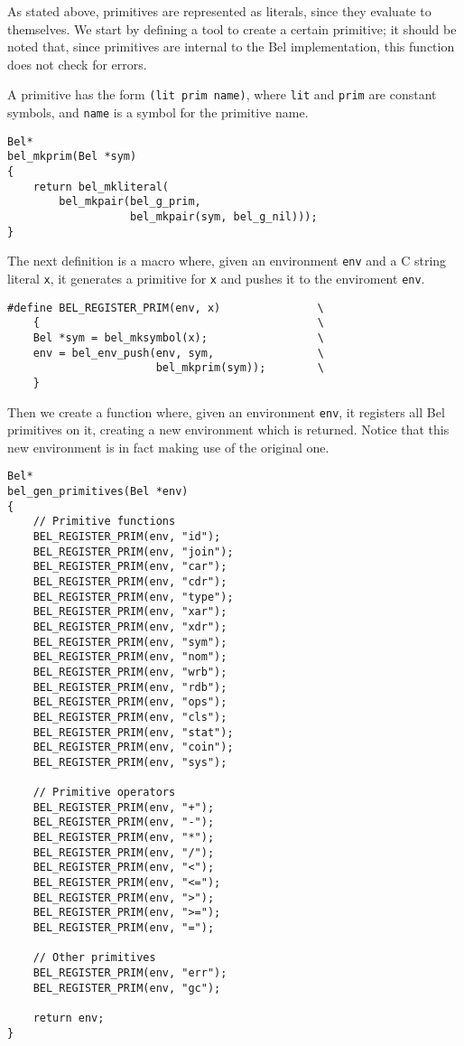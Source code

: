 \documentclass[openright,a4paper,twoside,12pt]{memoir}
\begin{document}
As stated above, primitives are represented as literals, since they
evaluate to themselves. We start by defining a tool to create a
certain primitive; it should be noted that, since primitives are
internal to the Bel implementation, this function does not check for
errors.

A primitive has the form \texttt{(lit prim name)}, where \texttt{lit} and \texttt{prim} are
constant symbols, and \texttt{name} is a symbol for the primitive name.

\begin{verbatim}
Bel*
bel_mkprim(Bel *sym)
{
    return bel_mkliteral(
        bel_mkpair(bel_g_prim,
                   bel_mkpair(sym, bel_g_nil)));
}
\end{verbatim}

The next definition is a macro where, given an environment \texttt{env} and a
C string literal \texttt{x}, it generates a primitive for \texttt{x} and pushes it to
the enviroment \texttt{env}.

\begin{verbatim}
#define BEL_REGISTER_PRIM(env, x)               \
    {                                           \
    Bel *sym = bel_mksymbol(x);                 \
    env = bel_env_push(env, sym,                \
                       bel_mkprim(sym));        \
    }
\end{verbatim}

Then we create a function where, given an environment \texttt{env}, it
registers all Bel primitives on it, creating a new environment which
is returned. Notice that this new environment is in fact making use of
the original one.

\begin{verbatim}
Bel*
bel_gen_primitives(Bel *env)
{
    // Primitive functions
    BEL_REGISTER_PRIM(env, "id");
    BEL_REGISTER_PRIM(env, "join");
    BEL_REGISTER_PRIM(env, "car");
    BEL_REGISTER_PRIM(env, "cdr");
    BEL_REGISTER_PRIM(env, "type");
    BEL_REGISTER_PRIM(env, "xar");
    BEL_REGISTER_PRIM(env, "xdr");
    BEL_REGISTER_PRIM(env, "sym");
    BEL_REGISTER_PRIM(env, "nom");
    BEL_REGISTER_PRIM(env, "wrb");
    BEL_REGISTER_PRIM(env, "rdb");
    BEL_REGISTER_PRIM(env, "ops");
    BEL_REGISTER_PRIM(env, "cls");
    BEL_REGISTER_PRIM(env, "stat");
    BEL_REGISTER_PRIM(env, "coin");
    BEL_REGISTER_PRIM(env, "sys");

    // Primitive operators
    BEL_REGISTER_PRIM(env, "+");
    BEL_REGISTER_PRIM(env, "-");
    BEL_REGISTER_PRIM(env, "*");
    BEL_REGISTER_PRIM(env, "/");
    BEL_REGISTER_PRIM(env, "<");
    BEL_REGISTER_PRIM(env, "<=");
    BEL_REGISTER_PRIM(env, ">");
    BEL_REGISTER_PRIM(env, ">=");
    BEL_REGISTER_PRIM(env, "=");

    // Other primitives
    BEL_REGISTER_PRIM(env, "err");
    BEL_REGISTER_PRIM(env, "gc");

    return env;
}
\end{verbatim}
\end{document}
